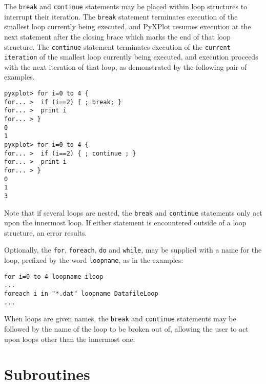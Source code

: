 The {\tt break} and {\tt continue} statements may be placed within loop
structures to interrupt their iteration. The {\tt break} statement terminates
execution of the smallest loop currently being executed, and PyXPlot resumes
execution at the next statement after the closing brace which marks the end of
that loop structure. The {\tt continue} statement terminates execution of the
{\tt current iteration} of the smallest loop currently being executed, and
execution proceeds with the next iteration of that loop, as demonstrated by the
following pair of examples.

\begin{verbatim}
pyxplot> for i=0 to 4 {
for... >  if (i==2) { ; break; }
for... >  print i
for... > }
0
1
pyxplot> for i=0 to 4 {
for... >  if (i==2) { ; continue ; }
for... >  print i
for... > }
0
1
3
\end{verbatim}

Note that if several loops are nested, the {\tt break} and {\tt continue}
statements only act upon the innermost loop. If either statement is encountered
outside of a loop structure, an error results.

Optionally, the {\tt for}, {\tt foreach}, {\tt do} and {\tt while}, may be
supplied with a name for the loop, prefixed by the word {\tt loopname}, as in
the examples:

\begin{verbatim}
for i=0 to 4 loopname iloop
...
foreach i in "*.dat" loopname DatafileLoop
...
\end{verbatim}

When loops are given names, the {\tt break} and {\tt continue} statements may
be followed by the name of the loop to be broken out of, allowing the user to
act upon loops other than the innermost one.

\section{Subroutines}
\label{sec:subroutines}

